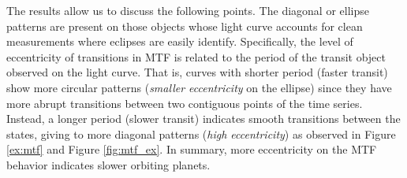 The results allow us to discuss the following points.
The diagonal or ellipse patterns are present on those objects whose light curve accounts for clean measurements where eclipses are easily identify. 
Specifically, the level of eccentricity of transitions in MTF is related to the period of the transit object observed on the light curve. 
That is, curves with shorter period (faster transit) show more circular patterns (\textit{smaller eccentricity} on the ellipse) since they have more abrupt transitions between two contiguous points of the time series. 
Instead, a longer period (slower transit) indicates smooth transitions between the states, giving to more diagonal patterns (\textit{high eccentricity}) as observed in Figure \ref{ex:mtf} and Figure \ref{fig:mtf_ex}.
In summary, more eccentricity on the MTF behavior indicates slower orbiting planets.

